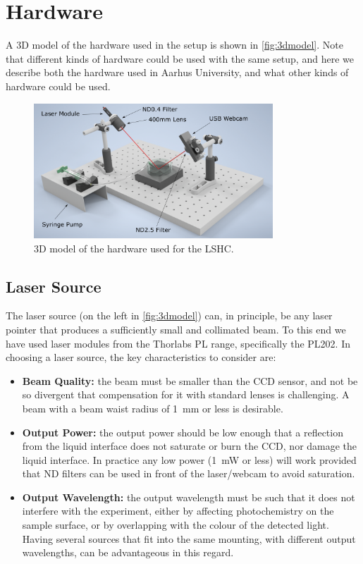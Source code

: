 \documentclass[11pt,a4paper,twoside]{article}
\begin{document}
\section{Hardware}
A 3D model of the hardware used in the setup is shown in \autoref{fig:3dmodel}. Note that different kinds of hardware could be used with the same setup, and here we describe both the hardware used in Aarhus University, and what other kinds of hardware could be used.

\begin{figure}
\centering
\includegraphics[width=0.8\textwidth]{heightsensor_pump_label.png}
\caption{3D model of the hardware used for the LSHC.}\label{fig:3dmodel}
\end{figure}

\subsection{Laser Source}
The laser source (on the left in \autoref{fig:3dmodel}) can, in principle, be any laser pointer that produces a sufficiently small and collimated beam. To this end we have used laser modules from the Thorlabs PL range, specifically the PL202. In choosing a laser source, the key characteristics to consider are:
\begin{itemize}
\item \textbf{Beam Quality:} the beam must be smaller than the CCD sensor, and not be so divergent that compensation for it with standard lenses is challenging. A beam with a beam waist radius of \SI{1}{\milli\metre} or less is desirable.
\item \textbf{Output Power:} the output power should be low enough that a reflection from the liquid interface does not saturate or burn the CCD, nor damage the liquid interface. In practice any low power (\SI{1}{\milli\watt} or less) will work provided that ND filters can be used in front of the laser/webcam to avoid saturation.
\item \textbf{Output Wavelength:} the output wavelength must be such that it does not interfere with the experiment, either by affecting photochemistry on the sample surface, or by overlapping with the colour of the detected light. Having several sources that fit into the same mounting, with different output wavelengths, can be advantageous in this regard.
\end{itemize}
\end{document}
